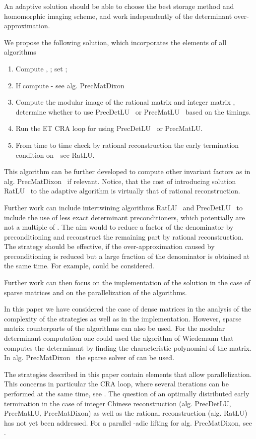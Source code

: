 \documentclass{acm_proc_article-sp}   \usepackage{graphicx,url}
\newcommand{\algrdRat}{RatLU}
\newcommand{\algrdDet}{PrecDetLU}
\newcommand{\algrdMat}{PrecMatLU}
\newcommand{\algrdDixon}{PrecMatDixon}
\begin{document}
An adaptive solution should be able to choose the best storage method and homomorphic imaging scheme,
and work independently of the determinant over-approximation.


We propose the following solution, which incorporates the elements of all algorithms \begin{enumerate}
\item Compute , ; set ;
\item If  compute  - see alg. \algrdDixon
\item Compute the modular image of the rational matrix  and integer matrix , determine whether to use \algrdDet~ or \algrdMat~ based on the timings.
\item Run the ET CRA loop for  using \algrdDet~ or \algrdMat.
\item From time to time check by rational reconstruction the early termination condition on  - see \algrdRat.
\end{enumerate}
This algorithm can be further developed to compute other invariant factors as in alg. \algrdDixon~ if relevant. Notice, that the cost of introducing solution \algrdRat~ to the adaptive algorithm is virtually that of rational reconstruction.

Further work can include intertwining algorithms \algrdRat~ and \algrdDet~ to include the use of less exact determinant preconditioners, which potentially are not a multiple of . The aim would to reduce a factor of the denominator by preconditioning and reconstruct the remaining part by rational reconstruction. The strategy should be effective, if the over-approximation caused by preconditioning is reduced but a large fraction of the denominator is obtained at the same time. For example,  could be considered.




Further work can then focus on the implementation of the solution in the case of sparse matrices and on the parallelization of the algorithms.

In this paper we have considered the case of dense matrices in the analysis of the complexity of the strategies as well as in the implementation. However, sparse matrix counterparts of the algorithms can also be used. For the modular determinant computation one could used the algorithm of Wiedemann \cite{Wiedemann:1986:SSLE} that computes the determinant by finding the characteristic polynomial of the matrix. In alg. \algrdDixon~ the sparse solver of \cite{EbGies2006} can be used.

The strategies described in this paper contain elements that allow parallelization. This concerns in particular the CRA loop, where several iterations can be performed at the same time, see \cite{Dumas2000}. The question of an optimally distributed early termination in the case of integer Chinese reconstruction (alg. \algrdDet, \algrdMat, \algrdDixon) as well as the rational reconstruction (alg. \algrdRat) has not yet been addressed. For a parallel -adic lifting for alg. \algrdDixon, see \cite{Dumas2002}.
\end{document}
